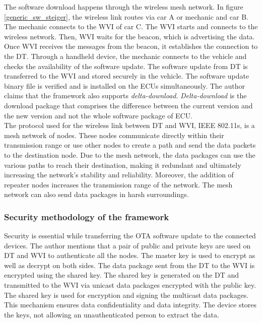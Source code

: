 \documentclass[12pt,a4paper]{article}
\begin{document}
The software download happens through the wireless mesh network. In figure \ref{generic_sw_steiger}, the wireless link routes via car A or mechanic and car B. The mechanic connects to the WVI of car C. The WVI starts and connects to the wireless network. Then, WVI waits for the beacon, which is advertising the data. Once WVI receives the messages from the beacon, it establishes the connection to the DT. Through a handheld device, the mechanic connects to the vehicle and checks the availability of the software update. The software update from DT is transferred to the WVI and stored securely in the vehicle. The software update binary file is verified and is installed on the ECUs simultaneously. The author claims that the framework also supports \textit{delta-download}. \textit{Delta-download} is the download package that comprises the difference between the current version and the new version and not the whole software package of ECU. \cite{r3} \\

The protocol used for the wireless link between DT and WVI, IEEE 802.11s, is a mesh network of nodes. These nodes communicate directly within their transmission range or use other nodes to create a path and send the data packets to the destination node. Due to the mesh network, the data packages can use the various paths to reach their destination, making it redundant and ultimately increasing the network's stability and reliability. Moreover, the addition of repeater nodes increases the transmission range of the network. The mesh network can also send data packages in harsh surroundings. \cite{r3}


\subsubsection{Security methodology of the framework}

Security is essential while transferring the OTA software update to the connected devices. The author mentions that a pair of public and private keys are used on DT and WVI to authenticate all the nodes. The master key is used to encrypt as well as decrypt on both sides. The data package sent from the DT to the WVI is encrypted using the shared key. The shared key is generated on the DT and transmitted to the WVI via unicast data packages encrypted with the public key. The shared key is used for encryption and signing the multicast data packages. This mechanism ensures data confidentiality and data integrity. The device stores the keys, not allowing an unauthenticated person to extract the data. \cite{r3} \\
\end{document}
